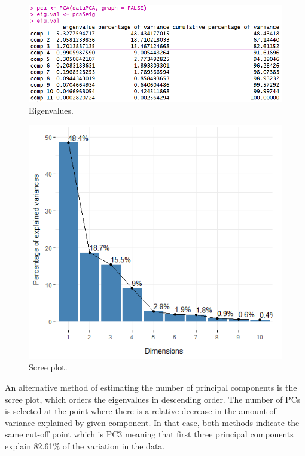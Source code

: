 \documentclass[12pt,a4paper,notitlepage]{report}
\begin{document}
\begin{figure}[h]
	\includegraphics[scale=0.80]{./Figures/Fig_3.2}
	\caption{Eigenvalues.}
	\label{Fig_3.2}
\end{figure}	

\begin{figure}
	\includegraphics[scale=0.6]{./Figures/Fig_3.3}
	\caption{Scree plot.}
	\label{Fig_3.3}
\end{figure}	

An alternative method of estimating the number of principal components is the scree plot, which orders the eigenvalues in descending order. The number of PCs is selected at the point where there is a relative decrease in the amount of variance explained by given component. In that case, both methods indicate the same cut-off point which is PC3 meaning that first three principal components explain 82.61\% of the variation in the data.
\end{document}
